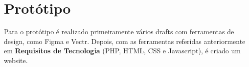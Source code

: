 \documentclass{scrreprt}
\begin{document}
\section{Protótipo}

Para o protótipo é realizado primeiramente vários drafts com ferramentas de design, como Figma e Vectr. Depois, com as ferramentas referidas anteriormente em \textbf{Requisitos de Tecnologia} (PHP, HTML, CSS e Javascript), é criado um website.



\end{document}
